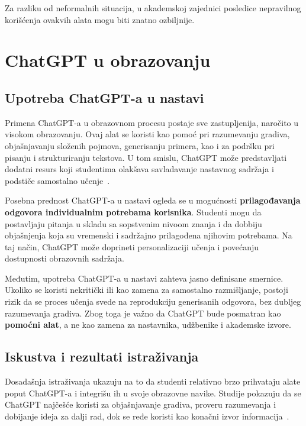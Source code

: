 \documentclass[a4paper, 12pt]{article}
\begin{document}
Za razliku od neformalnih situacija, u akademskoj zajednici posledice nepravilnog korišćenja ovakvih alata mogu biti znatno ozbiljnije.

\section{ChatGPT u obrazovanju}

\subsection{Upotreba ChatGPT-a u nastavi}

Primena ChatGPT-a u obrazovnom procesu postaje sve zastupljenija, naročito u visokom obrazovanju. Ovaj alat se koristi kao pomoć pri razumevanju gradiva, objašnjavanju složenih pojmova, generisanju primera, kao i za podršku pri pisanju i strukturiranju tekstova. U tom smislu, ChatGPT može predstavljati dodatni resurs koji studentima olakšava savladavanje nastavnog sadržaja i podstiče samostalno učenje~\cite{openai2023}.

Posebna prednost ChatGPT-a u nastavi ogleda se u mogućnosti \textbf{prilagođavanja odgovora individualnim potrebama korisnika}. Studenti mogu da postavljaju pitanja u skladu sa sopstvenim nivoom znanja i da dobbiju objašnjenja koja su vremenski i sadržajno prilagođena njihovim potrebama. Na taj način, ChatGPT može doprineti personalizaciji učenja i povećanju dostupnosti obrazovnih sadržaja.

Međutim, upotreba ChatGPT-a u nastavi zahteva jasno definisane smernice. Ukoliko se koristi nekritički ili kao zamena za samostalno razmišljanje, postoji rizik da se proces učenja svede na reprodukciju generisanih odgovora, bez dubljeg razumevanja gradiva. Zbog toga je važno da ChatGPT bude posmatran kao \textbf{pomoćni alat}, a ne kao zamena za nastavnika, udžbenike i akademske izvore.

\subsection{Iskustva i rezultati istraživanja}

Dosadašnja istraživanja ukazuju na to da studenti relativno brzo prihvataju alate poput ChatGPT-a i integrišu ih u svoje obrazovne navike. Studije pokazuju da se ChatGPT najčešće koristi za objašnjavanje gradiva, proveru razumevanja i dobijanje ideja za dalji rad, dok se ređe koristi kao konačni izvor informacija~\cite{bommasani2021}.
\end{document}
